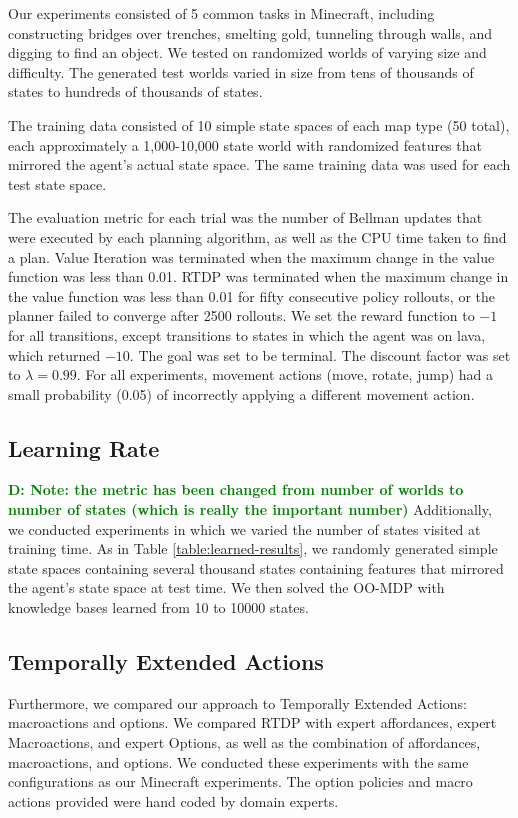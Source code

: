 \documentclass[conference]{IEEEtran}
\newcommand{\dnote}[1]{\textcolor{Green}{\textbf{D: #1}}}
\begin{document}
Our experiments consisted of 5 common tasks in Minecraft, including
constructing bridges over trenches, smelting gold, tunneling
through walls, and digging to find an object.  We tested on 
randomized worlds of varying size and difficulty. The generated test
worlds varied in size from tens of thousands of states to hundreds of thousands of states.

The training data consisted of 10 simple state spaces of each map type
(50 total), each approximately a 1,000-10,000 state world with randomized
features that mirrored the agent's actual state space. The same training data
was used for each test state space.

The evaluation metric for each trial was the
number of Bellman updates that were executed by each planning
algorithm, as well as the CPU time taken to find a plan. Value Iteration
was terminated when the maximum change in the value function was 
less than 0.01. RTDP was terminated when the maximum change in 
the value function was less than 0.01 for fifty consecutive policy rollouts,
or the planner failed to converge after 2500 rollouts. We set the reward 
function to $-1$ for all transitions, except transitions to states in which 
the agent was on lava, which returned $-10$. The goal was set to be 
terminal. The discount factor was set to $\lambda = 0.99$. For all experiments,
movement actions (move, rotate, jump) had a small probability (0.05) of 
incorrectly applying a different movement action.

\subsection{Learning Rate}
\dnote{Note: the metric has been changed from number of worlds to number of
states (which is really the important number)} Additionally, we conducted 
experiments in which we varied the number of states visited at training time. 
As in Table \ref{table:learned-results}, we randomly generated simple state spaces
containing several thousand states containing features that mirrored the agent's state
space at test time. We then solved the OO-MDP with knowledge bases learned from 
10 to 10000 states.

\subsection{Temporally Extended Actions}
Furthermore, we compared our approach to Temporally Extended Actions: 
macroactions and options. We compared RTDP with expert affordances, 
expert Macroactions, and expert Options, as well as the combination of 
affordances, macroactions, and options. We conducted these experiments 
with the same configurations as our Minecraft experiments. The option policies
and macro actions provided were hand coded by domain experts.
\end{document}
